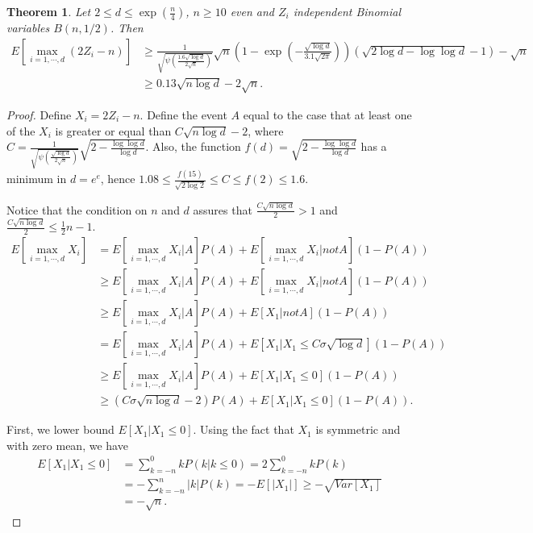 \documentclass{article}
\newtheorem{theorem}{Theorem}
\begin{document}
\begin{theorem}
\label{theo:max_bin}
Let $2 \leq d \leq \exp(\frac{n}{4})$, $n\geq 10$ even and $Z_i$ independent Binomial variables $B(n,1/2)$. Then
\begin{align*}
E\left[ \max_{i=1,\cdots,d} (2 Z_i - n)\right]
&\geq \frac{1}{\sqrt{\psi\left(\frac{1.6\sqrt{\log d}}{2 \sqrt{n}}\right)}}\sqrt{n}\left(1 - \exp\left(-\frac{\sqrt{\log d}}{3.1 \sqrt{2\pi}}\right)\right) \left(\sqrt{2 \log d -\log \log d}-1\right) -\sqrt{n} \\
&\geq 0.13 \sqrt{n \log d} - 2 \sqrt{n}.
\end{align*}
\end{theorem}
%
\begin{proof}
Define $X_i= 2 Z_i-n$.
Define the event $A$ equal to the case that at least one of the $X_i$ is greater or equal than $C \sqrt{n \log d}-2$, where $C=\frac{1}{\sqrt{\psi\left(\frac{\sqrt{\log d}}{2 \sqrt{n}}\right)}}\sqrt{2-\frac{\log \log d}{\log d}}$. Also, the function $f(d)=\sqrt{2-\frac{\log \log d}{\log d}}$ has a minimum in $d=e^e$, hence $1.08 \leq \frac{f(15)}{\sqrt{2 \log 2}} \leq C\leq f(2)\leq 1.6$.

Notice that the condition on $n$ and $d$ assures that $\frac{C \sqrt{n \log d}}{2}>1$ and $\frac{C \sqrt{n \log d}}{2}\leq \frac{1}{2} n -1$.
%
\begin{align*}
E[\max_{i=1,\cdots,d} X_i]
&= E[\max_{i=1,\cdots,d} X_i| A ] P(A) + E[\max_{i=1,\cdots,d} X_i| not A ] (1-P(A)) \\
&\geq E[\max_{i=1,\cdots,d} X_i| A ] P(A) + E[\max_{i=1,\cdots,d} X_i| not A ] (1-P(A))\\
&\geq E[\max_{i=1,\cdots,d} X_i| A ] P(A) + E[X_1| not A ](1-P(A)) \\
&= E[\max_{i=1,\cdots,d} X_i| A ] P(A) + E[X_1| X_1\leq C \sigma \sqrt{\log d}] (1-P(A))\\
&\geq E[\max_{i=1,\cdots,d} X_i| A ] P(A) + E[X_1| X_1\leq 0](1-P(A)) \\
&\geq (C \sigma \sqrt{n \log d} -2) P(A) + E[X_1| X_1\leq 0] (1-P(A)).
\end{align*}

First, we lower bound $E[X_1| X_1\leq 0]$. Using the fact that $X_1$ is symmetric and with zero mean, we have
\begin{align*}
E[X_1| X_1\leq 0] &= \sum_{k=-n}^0 k P(k | k\leq 0) = 2 \sum_{k=-n}^0 k P(k) \\
&= - \sum_{k=-n}^n |k| P(k) = - E[|X_1|] \geq - \sqrt{Var[X_1]}\\
&= -\sqrt{n}.
\end{align*}


\end{proof}
\end{document}
